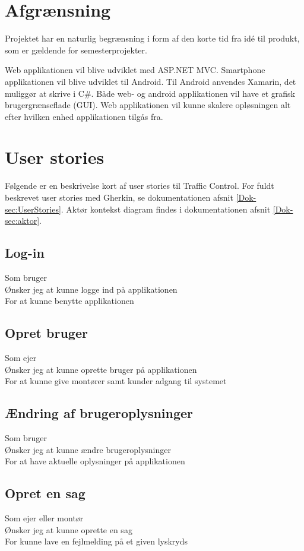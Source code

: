 					
				\section{Afgrænsning}
				Projektet har en naturlig begrænsning i form af den korte tid fra idé til produkt, som er gældende for semesterprojekter. 
				
				Web applikationen vil blive udviklet med ASP.NET MVC. 
				Smartphone applikationen vil blive udviklet til Android. Til Android anvendes Xamarin, det muliggør at skrive i C\#.
				Både web- og android applikationen vil have et grafisk brugergrænseflade (GUI). Web applikationen vil kunne skalere opløsningen alt efter hvilken enhed applikationen tilgås fra.\\

	
	\section{User stories} 
	Følgende er en beskrivelse kort af user stories til Traffic Control. For fuldt beskrevet user stories med Gherkin, se dokumentationen afsnit \vref{Dok-sec:UserStories}.
	Aktør kontekst diagram findes i dokumentationen afsnit \vref{Dok-sec:aktor}.

	\subsection*{Log-in}
	Som bruger\\
	Ønsker jeg at kunne logge ind på applikationen\\
	For at kunne benytte applikationen
	
	\subsection*{Opret bruger}
	Som ejer\\
	Ønsker jeg at kunne oprette bruger på applikationen\\
	For at kunne give montører samt kunder adgang til systemet
	
	\subsection*{Ændring af brugeroplysninger}
	Som bruger\\
	Ønsker jeg at kunne ændre brugeroplysninger\\
	For at have aktuelle oplysninger på applikationen
	
	\subsection*{Opret en sag}
	Som ejer eller montør\\
	Ønsker jeg at kunne oprette en sag\\
	For kunne lave en fejlmelding på et given lyskryds

